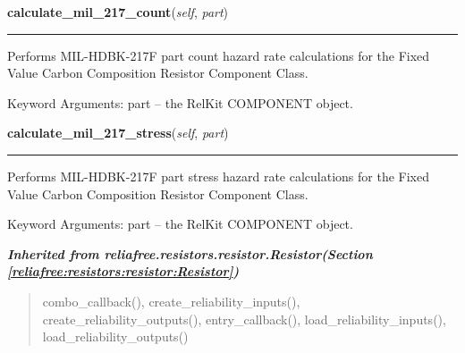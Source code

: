     \label{reliafree:resistors:fixed:Composition:calculate_mil_217_count}

    \vspace{0.5ex}

\hspace{.8\funcindent}\begin{boxedminipage}{\funcwidth}

    \raggedright \textbf{calculate\_mil\_217\_count}(\textit{self}, \textit{part})

    \vspace{-1.5ex}

    \rule{\textwidth}{0.5\fboxrule}
\setlength{\parskip}{2ex}
    Performs MIL-HDBK-217F part count hazard rate calculations for the 
    Fixed Value Carbon Composition Resistor Component Class.

    Keyword Arguments: part -- the RelKit COMPONENT object.

\setlength{\parskip}{1ex}
    \end{boxedminipage}

    \label{reliafree:resistors:fixed:Composition:calculate_mil_217_stress}

    \vspace{0.5ex}

\hspace{.8\funcindent}\begin{boxedminipage}{\funcwidth}

    \raggedright \textbf{calculate\_mil\_217\_stress}(\textit{self}, \textit{part})

    \vspace{-1.5ex}

    \rule{\textwidth}{0.5\fboxrule}
\setlength{\parskip}{2ex}
    Performs MIL-HDBK-217F part stress hazard rate calculations for the 
    Fixed Value Carbon Composition Resistor Component Class.

    Keyword Arguments: part -- the RelKit COMPONENT object.

\setlength{\parskip}{1ex}
    \end{boxedminipage}


\large{\textbf{\textit{Inherited from reliafree.resistors.resistor.Resistor\textit{(Section \ref{reliafree:resistors:resistor:Resistor})}}}}

\begin{quote}
combo\_callback(), create\_reliability\_inputs(), create\_reliability\_outputs(), entry\_callback(), load\_reliability\_inputs(), load\_reliability\_outputs()
\end{quote}
